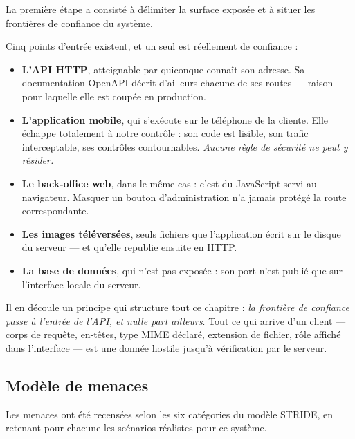 La première étape a consisté à délimiter la surface exposée et à situer les
frontières de confiance du système.


Cinq points d'entrée existent, et un seul est réellement de confiance :

\begin{itemize}[leftmargin=1.2cm]
  \item \textbf{L'API HTTP}, atteignable par quiconque connaît son adresse. Sa
  documentation OpenAPI décrit d'ailleurs chacune de ses routes --- raison pour
  laquelle elle est coupée en production.

  \item \textbf{L'application mobile}, qui s'exécute sur le téléphone de la
  cliente. Elle échappe totalement à notre contrôle : son code est lisible, son
  trafic interceptable, ses contrôles contournables. \emph{Aucune règle de
  sécurité ne peut y résider.}

  \item \textbf{Le back-office web}, dans le même cas : c'est du JavaScript
  servi au navigateur. Masquer un bouton d'administration n'a jamais protégé la
  route correspondante.

  \item \textbf{Les images téléversées}, seuls fichiers que l'application écrit
  sur le disque du serveur --- et qu'elle republie ensuite en HTTP.

  \item \textbf{La base de données}, qui n'est pas exposée : son port n'est
  publié que sur l'interface locale du serveur.
\end{itemize}

Il en découle un principe qui structure tout ce chapitre :
\emph{la frontière de confiance passe à l'entrée de l'API, et nulle part
ailleurs}. Tout ce qui arrive d'un client --- corps de requête, en-têtes, type
MIME déclaré, extension de fichier, rôle affiché dans l'interface --- est une
donnée hostile jusqu'à vérification par le serveur.

\subsection{Modèle de menaces}

Les menaces ont été recensées selon les six catégories du modèle STRIDE, en
retenant pour chacune les scénarios réalistes pour ce système.

